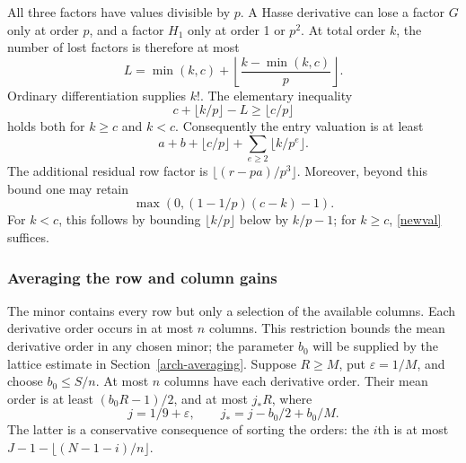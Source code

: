 \documentclass[11pt]{article}
\begin{document}
All three factors have values divisible by \(p\). A Hasse derivative
can lose a factor \(G\) only at order \(p\), and a factor \(H_1\)
only at order 1 or \(p^2\). At total order \(k\), the number of lost
factors is therefore at most
\[
 L=\min(k,c)+\left\lfloor\frac{k-\min(k,c)}p\right\rfloor.
\]
Ordinary differentiation supplies \(k!\). The elementary inequality
\[
 c+\lfloor k/p\rfloor-L\ge\lfloor c/p\rfloor
\]
holds both for \(k\ge c\) and \(k<c\). Consequently the entry
valuation is at least
\begin{equation}\label{newval}
 a+b+\lfloor c/p\rfloor+\sum_{e\ge2}\lfloor k/p^e\rfloor.
\end{equation}
The additional residual row factor is
\(\lfloor(r-pa)/p^3\rfloor\). Moreover, beyond this bound one may
retain
\begin{equation}\label{coupled-entry}
 \max\left(0,(1-1/p)(c-k)-1\right).
\end{equation}
For \(k<c\), this follows by bounding \(\lfloor k/p\rfloor\)
below by \(k/p-1\); for \(k\ge c\), \eqref{newval} suffices.

\subsubsection{Averaging the row and column gains}
The minor contains every row but only a selection of the available
columns. Each derivative order occurs in at most \(n\) columns.
This restriction bounds the mean derivative order in any chosen minor;
the parameter \(b_0\) will be supplied by the lattice estimate in
Section~\ref{arch-averaging}.
Suppose \(R\ge M\), put \(\varepsilon=1/M\), and choose
\(b_0\le S/n\). At most \(n\) columns have each derivative order.
Their mean order is at least \((b_0R-1)/2\), and at most \(j_*R\),
where
\begin{equation}\label{jstar}
 j=1/9+\varepsilon,\qquad j_*=j-b_0/2+b_0/M.
\end{equation}
The latter is a conservative consequence of sorting the orders:
the \(i\)th is at most \(J-1-\lfloor(N-1-i)/n\rfloor\).
\end{document}
